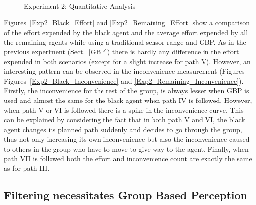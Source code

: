 \begin{figure}[!t]
  \centering
  \hspace{1pt}
  \\
  \hspace{1pt}
  \caption{Experiment 2: Quantitative Analysis}
  \label{Exp2_QuantitativeAnalysis}
\end{figure}

Figures~\ref{Exp2_Black_Effort} and \ref{Exp2_Remaining_Effort} show a comparison of the effort expended by the black agent and the average effort expended by all the remaining agents while using a traditional sensor range and GBP. As in the previous experiment (Sect.~\ref{GBP}) there is hardly any difference in the effort expended in both scenarios (except for a slight increase for path V). However, an interesting pattern can be observed in the inconvenience measurement (Figures Figures~\ref{Exp2_Black_Inconvenience} and \ref{Exp2_Remaining_Inconvenience}). Firstly, the inconvenience for the rest of the group, is always lesser when GBP is used and almost the same for the black agent when path IV is followed. However, when path V or VI is followed there is a spike in the inconvenience curve. This can be explained by considering the fact that in both path V and VI, the black agent changes its planned path suddenly and decides to go through the group, thus not only increasing its own inconvenience but also the inconvenience caused to others in the group who have to move to give way to the agent. Finally, when path VII is followed both the effort and inconvenience count are exactly the same as for path III.

\subsection{Filtering necessitates Group Based Perception}



